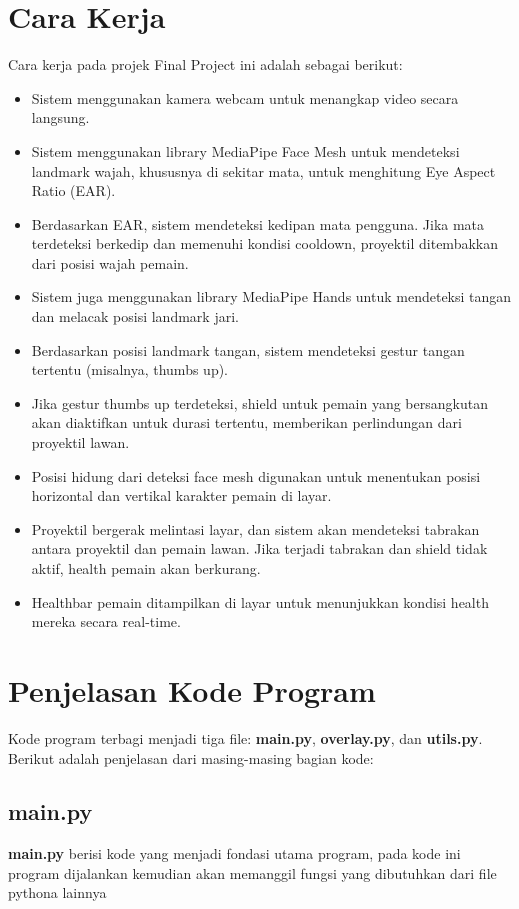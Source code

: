 \documentclass[11pt,a4paper]{article}
\begin{document}
\section{Cara Kerja}
Cara kerja pada projek Final Project ini adalah sebagai berikut:
\begin{itemize}
    \item Sistem menggunakan kamera webcam untuk menangkap video secara langsung.
    \item Sistem menggunakan library MediaPipe Face Mesh untuk mendeteksi landmark wajah, khususnya di sekitar mata, untuk menghitung Eye Aspect Ratio (EAR).
    \item Berdasarkan EAR, sistem mendeteksi kedipan mata pengguna. Jika mata terdeteksi berkedip dan memenuhi kondisi cooldown, proyektil ditembakkan dari posisi wajah pemain.
    \item Sistem juga menggunakan library MediaPipe Hands untuk mendeteksi tangan dan melacak posisi landmark jari.
    \item Berdasarkan posisi landmark tangan, sistem mendeteksi gestur tangan tertentu (misalnya, thumbs up).
    \item Jika gestur thumbs up terdeteksi, shield untuk pemain yang bersangkutan akan diaktifkan untuk durasi tertentu, memberikan perlindungan dari proyektil lawan.
    \item Posisi hidung dari deteksi face mesh digunakan untuk menentukan posisi horizontal dan vertikal karakter pemain di layar.
    \item Proyektil bergerak melintasi layar, dan sistem akan mendeteksi tabrakan antara proyektil dan pemain lawan. Jika terjadi tabrakan dan shield tidak aktif, health pemain akan berkurang.
    \item Healthbar pemain ditampilkan di layar untuk menunjukkan kondisi health mereka secara real-time.
\end{itemize}

\section{Penjelasan Kode Program}
Kode program terbagi menjadi tiga file: \textbf{main.py}, \textbf{overlay.py}, dan \textbf{utils.py}. Berikut adalah penjelasan dari masing-masing bagian kode:
\subsection{main.py}
\textbf{main.py} berisi kode yang menjadi fondasi utama program, pada kode ini program dijalankan kemudian akan memanggil fungsi yang dibutuhkan dari file pythona lainnya
\end{document}
